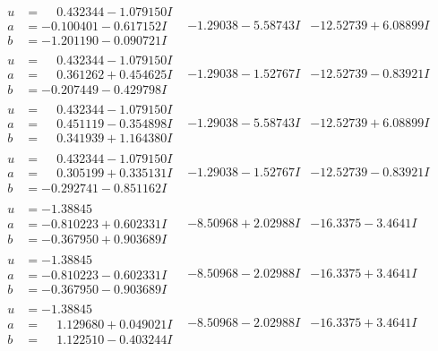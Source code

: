 \documentclass[1p]{elsarticle_modified}
\theoremstyle{definition}
\begin{document}
$$\begin{array}{c|c|c}
\begin{aligned}
u &= \phantom{-}0.432344 - 1.079150 I \\
a &= -0.100401 - 0.617152 I \\
b &= -1.201190 - 0.090721 I\end{aligned}
 & -1.29038 - 5.58743 I & -12.52739 + 6.08899 I \\ \hline\begin{aligned}
u &= \phantom{-}0.432344 - 1.079150 I \\
a &= \phantom{-}0.361262 + 0.454625 I \\
b &= -0.207449 - 0.429798 I\end{aligned}
 & -1.29038 - 1.52767 I & -12.52739 - 0.83921 I \\ \hline\begin{aligned}
u &= \phantom{-}0.432344 - 1.079150 I \\
a &= \phantom{-}0.451119 - 0.354898 I \\
b &= \phantom{-}0.341939 + 1.164380 I\end{aligned}
 & -1.29038 - 5.58743 I & -12.52739 + 6.08899 I \\ \hline\begin{aligned}
u &= \phantom{-}0.432344 - 1.079150 I \\
a &= \phantom{-}0.305199 + 0.335131 I \\
b &= -0.292741 - 0.851162 I\end{aligned}
 & -1.29038 - 1.52767 I & -12.52739 - 0.83921 I \\ \hline\begin{aligned}
u &= -1.38845\phantom{ +0.000000I} \\
a &= -0.810223 + 0.602331 I \\
b &= -0.367950 + 0.903689 I\end{aligned}
 & -8.50968 + 2.02988 I & -16.3375 - 3.4641 I \\ \hline\begin{aligned}
u &= -1.38845\phantom{ +0.000000I} \\
a &= -0.810223 - 0.602331 I \\
b &= -0.367950 - 0.903689 I\end{aligned}
 & -8.50968 - 2.02988 I & -16.3375 + 3.4641 I \\ \hline\begin{aligned}
u &= -1.38845\phantom{ +0.000000I} \\
a &= \phantom{-}1.129680 + 0.049021 I \\
b &= \phantom{-}1.122510 - 0.403244 I\end{aligned}
 & -8.50968 - 2.02988 I & -16.3375 + 3.4641 I \\ \hline\begin{aligned}

\end{aligned}
\end{array}$$
\end{document}
